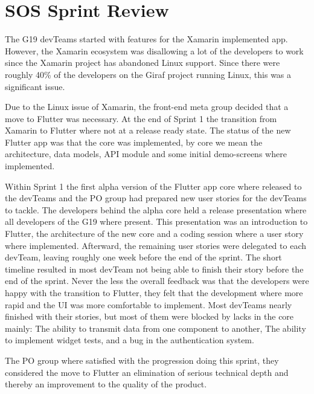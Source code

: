 \section{SOS Sprint Review}
The \gls{G19} \glspl{devTeam} started with features for the Xamarin implemented app. However, the Xamarin ecosystem was disallowing a lot of the developers to work since the Xamarin project has abandoned Linux support. Since there were roughly 40\% of the developers on the Giraf project running Linux, this was a significant issue.

Due to the Linux issue of Xamarin, the front-end meta group decided that a move to Flutter was necessary. At the end of Sprint 1 the transition from Xamarin to Flutter where not at a release ready state. The status of the new Flutter app was that the core was implemented, by core we mean the architecture, data models, API module and some initial demo-screens where implemented.

Within Sprint 1 the first alpha version of the Flutter app core where released to the \glspl{devTeam} and the \gls{PO} group had prepared new user stories for the \glspl{devTeam} to tackle. The developers behind the alpha core held a release presentation where all developers of the \gls{G19} where present. This presentation was an introduction to Flutter, the architecture of the new core and a coding session where a user story where implemented. Afterward, the remaining user stories were delegated to each \gls{devTeam}, leaving roughly one week before the end of the sprint. The short timeline resulted in most \gls{devTeam} not being able to finish their story before the end of the sprint. Never the less the overall feedback was that the developers were happy with the transition to Flutter, they felt that the development where more rapid and the UI was more comfortable to implement. Most \glspl{devTeam} nearly finished with their stories, but most of them were blocked by lacks in the core mainly: The ability to transmit data from one component to another, The ability to implement widget tests, and a bug in the authentication system.

The \gls{PO} group where satisfied with the progression doing this sprint, they considered the move to Flutter an elimination of serious technical depth and thereby an improvement to the quality of the product.